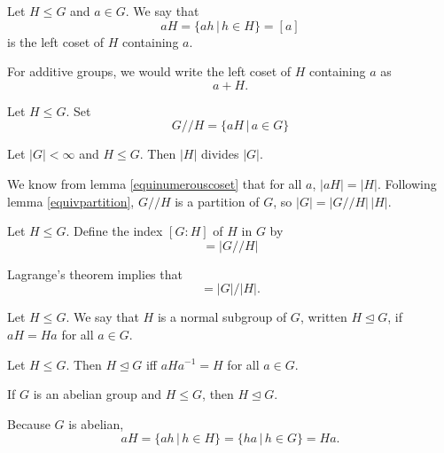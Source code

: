 \documentclass{article}
\begin{document}
\begin{defi}
	Let \(H\leq G\) and \(a\in G\). We say that
	\begin{equation*}
		aH=\{ah\,|\,h\in H\}=[a]
	\end{equation*}
	is the left coset of \(H\) containing \(a\).
\end{defi}
\begin{rema}
	For additive groups, we would write the left coset of \(H\) containing \(a\) as
	\begin{equation*}
		a+H.
	\end{equation*}
\end{rema}
\begin{rema}
	Let \(H\leq G\). Set
	\begin{equation*}
		G//H=\{aH\,|\,a\in G\}
	\end{equation*}
\end{rema}
\begin{thm}
	\label{lagrangethm}
	Let \(\lvert G\rvert<\infty\) and \(H\leq G\). Then \(\lvert H\rvert\) divides \(\lvert G\rvert\).
	\begin{IEEEproof}
		We know from lemma \ref{equinumerouscoset} that for all \(a\), \(\lvert aH\rvert=\lvert H\rvert\). Following lemma \ref{equivpartition}, \(G//H\) is a partition of \(G\), so \(\lvert G\rvert=\lvert G//H\rvert\,\lvert H\rvert\).
	\end{IEEEproof}
\end{thm}
\begin{defi}[Index]
	Let \(H\leq G\). Define the index \([G:H]\) of \(H\) in \(G\) by
	\begin{equation*}
		[G:H]=\lvert G//H\rvert
	\end{equation*}
\end{defi}
\begin{rema}
	Lagrange's theorem implies that
	\begin{equation*}
		[G:H]=\lvert G\rvert /\lvert H\rvert.
	\end{equation*}
\end{rema}
\begin{defi}
	Let \(H\leq G\). We say that \(H\) is a normal subgroup of \(G\), written \(H\trianglelefteq G\), if \(aH=Ha\) for all \(a\in G\).
\end{defi}
\begin{lem}
	Let \(H\leq G\). Then \(H\trianglelefteq G\) iff \(aHa^{-1}=H\) for all \(a\in G\).
\end{lem}
\begin{lem}
	If \(G\) is an abelian group and \(H\leq G\), then \(H\trianglelefteq G\).
	\begin{IEEEproof}
		Because \(G\) is abelian,
		\begin{equation*}
			aH=\{ah\,|\,h\in H\}=\{ha\,|\,h\in G\}=Ha.
		\end{equation*}
	\end{IEEEproof}
\end{lem}
\end{document}
